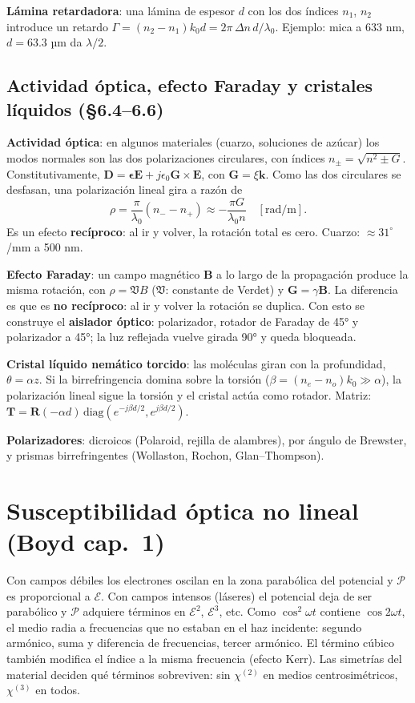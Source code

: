 \documentclass[10pt]{article}
\newcommand{\Ec}{\boldsymbol{\mathcal E}}
\newcommand{\Pc}{\boldsymbol{\mathcal P}}
\newcommand{\E}{\mathbf E}
\newcommand{\D}{\mathbf D}
\newcommand{\kv}{\mathbf k}
\newcommand{\T}{\mathbf T}
\newcommand{\R}{\mathbf R}
\begin{document}
\textbf{Lámina retardadora}: una lámina de espesor $d$ con los dos índices $n_1$, $n_2$ introduce un retardo $\Gamma=(n_2-n_1)k_0d=2\pi\,\Delta n\,d/\lambda_0$. Ejemplo: mica a 633 nm, $d=63.3$ µm da $\lambda/2$.

\subsection{Actividad óptica, efecto Faraday y cristales líquidos (§6.4–6.6)}
\textbf{Actividad óptica}: en algunos materiales (cuarzo, soluciones de azúcar) los modos normales son las dos polarizaciones circulares, con índices $n_\pm=\sqrt{n^2\pm G}$. Constitutivamente, $\D=\boldsymbol\epsilon\E+j\epsilon_0\mathbf G\times\E$, con $\mathbf G=\xi\kv$. Como las dos circulares se desfasan, una polarización lineal gira a razón de
\[
\rho=\frac{\pi}{\lambda_0}(n_--n_+)\approx-\frac{\pi G}{\lambda_0n}\quad[\text{rad/m}].
\]
Es un efecto \textbf{recíproco}: al ir y volver, la rotación total es cero. Cuarzo: $\approx31^\circ$/mm a 500 nm.

\textbf{Efecto Faraday}: un campo magnético $\mathbf B$ a lo largo de la propagación produce la misma rotación, con $\rho=\mathfrak VB$ ($\mathfrak V$: constante de Verdet) y $\mathbf G=\gamma\mathbf B$. La diferencia es que es \textbf{no recíproco}: al ir y volver la rotación se duplica. Con esto se construye el \textbf{aislador óptico}: polarizador, rotador de Faraday de 45° y polarizador a 45°; la luz reflejada vuelve girada 90° y queda bloqueada.

\textbf{Cristal líquido nemático torcido}: las moléculas giran con la profundidad, $\theta=\alpha z$. Si la birrefringencia domina sobre la torsión ($\beta=(n_e-n_o)k_0\gg\alpha$), la polarización lineal sigue la torsión y el cristal actúa como rotador. Matriz: $\T=\R(-\alpha d)\,\mathrm{diag}(e^{-j\beta d/2},e^{j\beta d/2})$.

\textbf{Polarizadores}: dicroicos (Polaroid, rejilla de alambres), por ángulo de Brewster, y prismas birrefringentes (Wollaston, Rochon, Glan–Thompson).

\section{Susceptibilidad óptica no lineal (Boyd cap.~1)}

\begin{idea}
Con campos débiles los electrones oscilan en la zona parabólica del potencial y $\Pc$ es proporcional a $\Ec$. Con campos intensos (láseres) el potencial deja de ser parabólico y $\Pc$ adquiere términos en $\Ec^2$, $\Ec^3$, etc. Como $\cos^2\omega t$ contiene $\cos2\omega t$, el medio radia a frecuencias que no estaban en el haz incidente: segundo armónico, suma y diferencia de frecuencias, tercer armónico. El término cúbico también modifica el índice a la misma frecuencia (efecto Kerr). Las simetrías del material deciden qué términos sobreviven: sin $\chi^{(2)}$ en medios centrosimétricos, $\chi^{(3)}$ en todos.
\end{idea}
\end{document}
